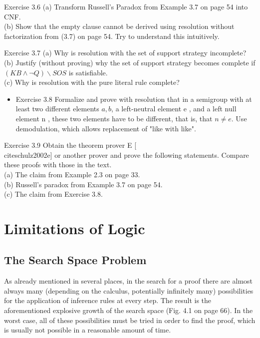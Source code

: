 \documentclass[10pt]{book}
\begin{document}
Exercise 3.6
(a) Transform Russell's Paradox from Example 3.7 on page 54 into CNF.\\
(b) Show that the empty clause cannot be derived using resolution without factorization from (3.7) on page 54. Try to understand this intuitively.

Exercise 3.7
(a) Why is resolution with the set of support strategy incomplete?\\
(b) Justify (without proving) why the set of support strategy becomes complete if $(K B \wedge \neg Q) \backslash S O S$ is satisfiable.\\
(c) Why is resolution with the pure literal rule complete?

\begin{itemize}
  \item Exercise 3.8 Formalize and prove with resolution that in a semigroup with at least two different elements $a, b$, a left-neutral element e , and a left null element n , these two elements have to be different, that is, that $n \neq e$. Use demodulation, which allows replacement of "like with like".
\end{itemize}

Exercise 3.9 Obtain the theorem prover E [\\cite{schulz2002e}] or another prover and prove the following statements. Compare these proofs with those in the text.\\
(a) The claim from Example 2.3 on page 33.\\
(b) Russell's paradox from Example 3.7 on page 54.\\
(c) The claim from Exercise 3.8.

\chapter{Limitations of Logic}

\section{The Search Space Problem}
As already mentioned in several places, in the search for a proof there are almost always many (depending on the calculus, potentially infinitely many) possibilities for the application of inference rules at every step. The result is the aforementioned explosive growth of the search space (Fig. 4.1 on page 66). In the worst case, all of these possibilities must be tried in order to find the proof, which is usually not possible in a reasonable amount of time.
\end{document}
